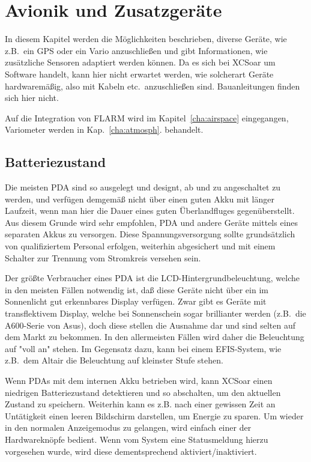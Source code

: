 \chapter{Avionik und Zusatzgeräte}\label{cha:avionics-airframe}

In diesem Kapitel werden  die Möglichkeiten beschrieben,  diverse Geräte, wie z.B.\ ein GPS oder ein Vario anzuschließen und gibt Informationen, wie zusätzliche Sensoren adaptiert werden können.
\warning  Da es sich bei \textsf{XCSoar} um Software handelt, kann hier nicht erwartet werden, wie solcherart Geräte hardwaremäßig, also mit Kabeln etc.\ anzuschließen sind. Bauanleitungen finden sich hier nicht.

Auf die Integration von FLARM wird im Kapitel~\ref{cha:airspace}  eingegangen, Variometer werden in Kap.~\ref{cha:atmosph}.   behandelt.

\section{Batteriezustand}

Die meisten \textsf{PDA} sind so ausgelegt und designt, ab und zu angeschaltet zu werden, und verfügen demgemäß nicht über einen guten Akku mit länger Laufzeit, wenn man hier die Dauer eines guten Überlandfluges gegenüberstellt. Aus diesem Grunde wird sehr empfohlen, \textsf{PDA} und andere Geräte mittels eines separaten Akkus zu versorgen. Diese Spannungsversorgung sollte grundsätzlich von qualifiziertem Personal erfolgen, weiterhin abgesichert und mit einem Schalter zur  Trennung vom Stromkreis versehen sein.

Der größte Verbraucher eines \textsf{PDA} ist die LCD-Hintergrundbeleuchtung, welche in den meisten Fällen notwendig ist, daß diese Geräte nicht über ein im Sonnenlicht gut erkennbares Display verfügen. Zwar gibt es Geräte mit transflektivem Display, welche bei Sonnenschein sogar brillianter werden (z.B.\ die A600-Serie von Asus), doch diese stellen die Ausnahme dar und sind selten auf dem Markt zu bekommen.  In den allermeisten Fällen wird daher die Beleuchtung auf "voll an" stehen. Im Gegensatz dazu, kann bei einem EFIS-System, wie z.B.\ dem \textsf{Altair} die Beleuchtung auf kleinster Stufe stehen.


Wenn \textsf{PDA}s mit dem internen Akku betrieben wird, kann  \textsf{XCSoar} einen niedrigen Batteriezustand detektieren und so abschalten, um den aktuellen Zustand zu speichern. Weiterhin kann es z.B. nach einer gewissen Zeit an Untätigkeit einen leeren Bildschirm  darstellen, um Energie zu sparen.   Um wieder in den normalen Anzeigemodus zu gelangen, wird einfach einer der Hardwareknöpfe bedient. Wenn vom System eine Statusmeldung hierzu vorgesehen wurde, wird diese dementsprechend aktiviert/inaktiviert.

